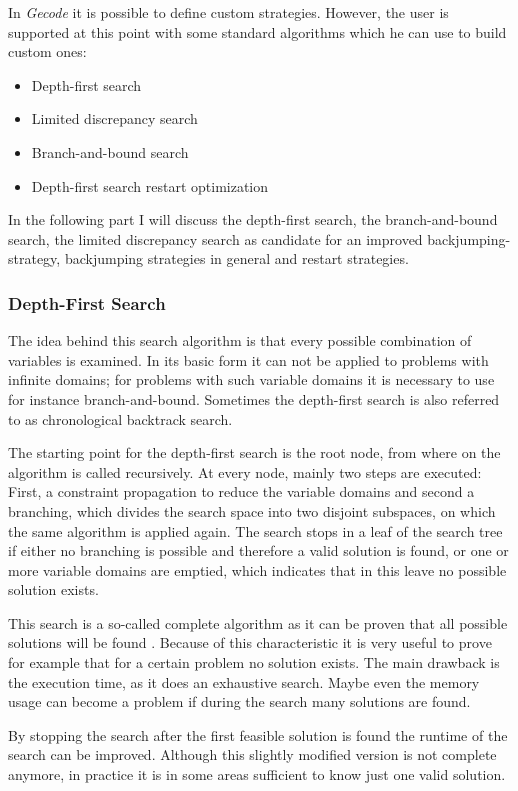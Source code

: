 \documentclass[10pt,
               a4paper,
               journal,
               ]{IEEEtran}
\begin{document}
	In \emph{Gecode} it is possible to define custom strategies. However, the user is supported at this point with some standard algorithms which he can use to build custom ones:
	\begin{itemize}
		\item Depth-first search
		\item Limited discrepancy search
		\item Branch-and-bound search
		\item Depth-first search restart optimization
	\end{itemize}
	
	In the following part I will discuss the depth-first search, the branch-and-bound search, the limited discrepancy search as candidate for an improved backjumping-strategy, backjumping strategies in general and restart strategies.
	
	\subsubsection{Depth-First Search}
	The idea behind this search algorithm is that every possible combination of variables is examined. In its basic form it can not be applied to problems with infinite domains; for problems with such variable domains it is necessary to use for instance branch-and-bound. Sometimes the depth-first search is also referred to as chronological backtrack search.
	
	The starting point for the depth-first search is the root node, from where on the algorithm is called recursively. At every node, mainly two steps are executed: First, a constraint propagation to reduce the variable domains and second a branching, which divides the search space into two disjoint subspaces, on which the same algorithm is applied again. The search stops in a leaf of the search tree if either no branching is possible and therefore a valid solution is found, or one or more variable domains are emptied, which indicates that in this leave no possible solution exists.
	
	This search is a so-called complete algorithm as it can be proven that all possible solutions will be found \cite[p.~85]{handbookCP}. Because of this characteristic it is very useful to prove for example that for a certain problem no solution exists. The main drawback is the execution time, as it does an exhaustive search. Maybe even the memory usage can become a problem if during the search many solutions are found.
	
	By stopping the search after the first feasible solution is found the runtime of the search can be improved. Although this slightly modified version is not complete anymore, in practice it is in some areas sufficient to know just one valid solution.
	
\end{document}
